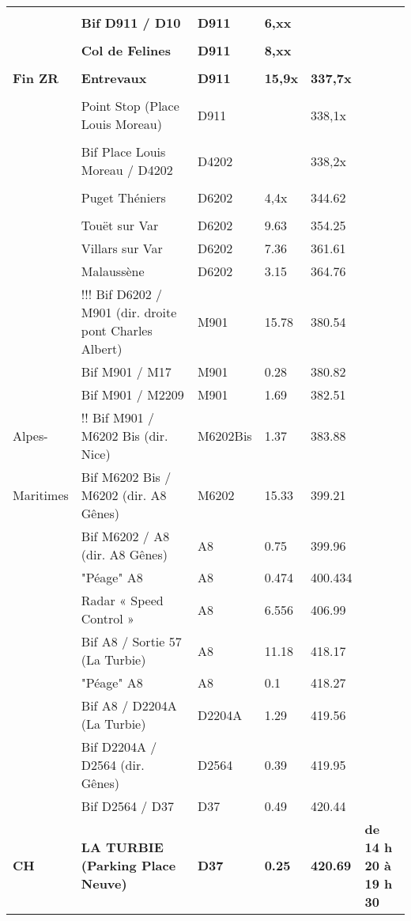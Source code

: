 \documentclass{article}%
\begin{document}
\begin{longtable}{p{2.25cm}|p{7.0cm}|p{1.5cm}|p{1.5cm}|p{1.5cm}|p{3.5cm}}
 & & & & & \\%
 &\textbf{Bif D911 / D10 }&\textbf{D911 }&\textbf{6,xx}& & \\%
 & & & & & \\%
 &\textbf{Col de Felines}&\textbf{D911 }&\textbf{8,xx}& & \\%
 & & & & & \\%
\textbf{Fin ZR}&\textbf{Entrevaux}&\textbf{D911 }&\textbf{15,9x}&\textbf{337,7x}& \\%
 & & & & & \\%
 &Point Stop (Place Louis Moreau)&D911 & &338,1x& \\%
 & & & & & \\%
 &Bif Place Louis Moreau  / D4202 &D4202& &338,2x& \\%
 & & & & & \\%
 &Puget Théniers &D6202&4,4x&344.62& \\%
 & & & & & \\%
 &Touët sur Var&D6202&9.63&354.25& \\%
 &Villars sur Var&D6202&7.36&361.61& \\%
 &Malaussène&D6202&3.15&364.76& \\%
 &!!! Bif D6202 / M901  (dir. droite pont Charles Albert)&M901&15.78&380.54& \\%
 &Bif M901 / M17&M901 &0.28&380.82& \\%
 &Bif M901 / M2209 &M901&1.69&382.51& \\%
Alpes-&!! Bif M901 / M6202 Bis (dir. Nice)&M6202Bis&1.37&383.88& \\%
Maritimes&Bif M6202 Bis / M6202 (dir. A8 Gênes) &M6202 &15.33&399.21& \\%
 &Bif M6202 / A8 (dir. A8 Gênes) &A8&0.75&399.96& \\%
 &"Péage" A8&A8&0.474&400.434& \\%
 &Radar « Speed Control »&A8&6.556&406.99& \\%
 &Bif A8 / Sortie 57 (La Turbie)&A8&11.18&418.17& \\%
 &"Péage" A8&A8&0.1&418.27& \\%
 &Bif A8 / D2204A (La Turbie)&D2204A&1.29&419.56& \\%
 &Bif D2204A / D2564 (dir. Gênes)&D2564&0.39&419.95& \\%
 &Bif D2564 / D37&D37&0.49&420.44& \\%
\textbf{CH}&\textbf{LA TURBIE (Parking Place Neuve) }&\textbf{D37}&\textbf{0.25}&\textbf{420.69}&\textbf{de 14 h 20 à 19 h 30}\\%
\hline%
\end{longtable}%
\end{document}
